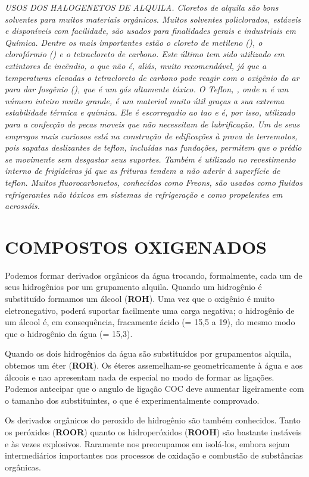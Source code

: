 \noindent\emph{USOS DOS HALOGENETOS DE ALQUILA. Cloretos de alquila são bons solventes para muitos materiais orgânicos. Muitos solventes policlorados, estáveis e disponíveis com facilidade, são usados para finalidades gerais e industriais em Química. Dentre os mais importantes estão o cloreto de metileno (), o clorofórmio () e o tetracloreto de carbono. Este último tem sido utilizado em extintores de incêndio, o que não é, aliás, muito recomendável, já que a temperaturas elevadas o tetracloreto de carbono pode reagir com o oxigênio do ar para dar fosgênio (), que é um gás altamente tóxico. O Teflon, , onde $n$ é um número inteiro muito grande, é um material muito útil graças a sua extrema estabilidade térmica e química. Ele é escorregadio ao tao e é, por isso, utilizado para a confecção de pecas moveis que não necessitam de lubrificação. Um de seus empregos mais curiosos está na construção de edificações à prova de terremotos, pois sapatas deslizantes de teflon, incluídas nas fundações, permitem que o prédio se movimente sem desgastar seus suportes. Também é utilizado no revestimento interno de frigideiras já que as frituras tendem a não aderir à superfície de teflon. Muitos fluorocarbonetos, conhecidos como Freons, são usados como fluidos refrigerantes não tóxicos em sistemas de refrigeração e como propelentes em aerossóis.}

\section{COMPOSTOS OXIGENADOS}

Podemos formar derivados orgânicos da água trocando, formalmente, cada um de seus hidrogênios por um grupamento alquila. Quando um hidrogênio é substituído formamos um álcool (\textbf{ROH}). Uma vez que o oxigênio é muito eletronegativo, poderá suportar facilmente uma carga negativa; o hidrogênio de um álcool é, em consequência, fracamente ácido (\pKa\enspace = 15,5 a 19), do mesmo modo que o hidrogênio da água (\pKa\enspace = 15,3).

Quando os dois hidrogênios da água são substituídos por grupamentos alquila, obtemos um éter (\textbf{ROR}). Os éteres assemelham-se geometricamente à água e aos álcoois e nao apresentam nada de especial no modo de formar as ligações. Podemos antecipar que o angulo de ligação COC deve aumentar ligeiramente com o tamanho dos substituintes, o que é experimentalmente comprovado. 

Os derivados orgânicos do peroxido de hidrogênio são também conhecidos. Tanto os peróxidos (\textbf{ROOR}) quanto os hidroperóxidos (\textbf{ROOH}) são bastante instáveis e às vezes explosivos. Raramente nos preocupamos em isolá-los, embora sejam intermediários importantes nos processos de oxidação e combustão de substâncias orgânicas.

